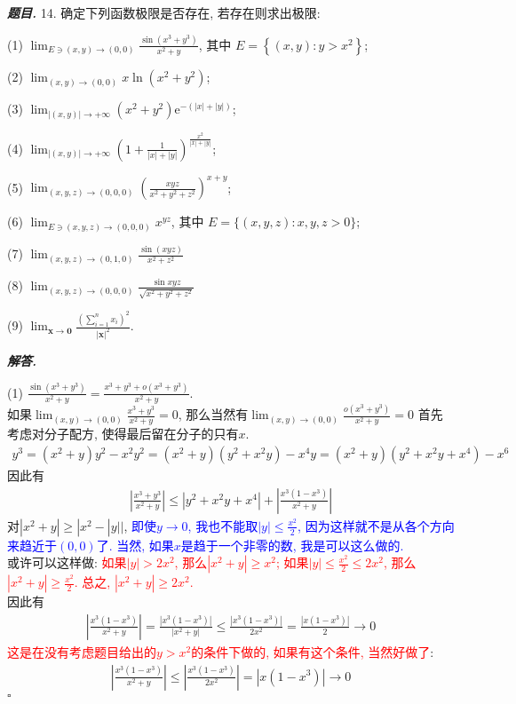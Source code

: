 \documentclass[10pt, a4paper, oneside]{ctexart}
\newenvironment{problem}{\begin{framed}\par\noindent\textbf{\textit{题目. }}}{\end{framed}\par}
\newenvironment{solution}{%
  \par\noindent\textbf{\textit{解答. }}\ignorespaces
}{%
  \hfill\ensuremath{\square}\par %
}
\begin{document}
\begin{problem}
14. 确定下列函数极限是否存在, 若存在则求出极限:

(1) $\lim _{E \ni(x, y) \rightarrow(0,0)} \frac{\sin \left(x^3+y^3\right)}{x^2+y}$, 其中 $E=\left\{(x, y): y>x^2\right\}$;

(2) $\lim _{(x, y) \rightarrow(0,0)} x \ln \left(x^2+y^2\right)$;

(3) $\lim _{|(x, y)| \rightarrow+\infty}\left(x^2+y^2\right) \mathrm{e}^{-(|x|+|y|)}$;

(4) $\lim _{|(x, y)| \rightarrow+\infty}\left(1+\frac{1}{|x|+|y|}\right)^{\frac{x^2}{|x|+|y|}}$;

(5) $\lim _{(x, y, z) \rightarrow(0,0,0)}\left(\frac{x y z}{x^2+y^2+z^2}\right)^{x+y}$;

(6) $\lim _{E \ni(x, y, z) \rightarrow(0,0,0)} x^{y z}$, 其中 $E=\{(x, y, z): x, y, z>0\}$;

(7) $\lim _{(x, y, z) \rightarrow(0,1,0)} \frac{\sin (x y z)}{x^2+z^2}$

(8) $\lim _{(x, y, z) \rightarrow(0,0,0)} \frac{\sin x y z}{\sqrt{x^2+y^2+z^2}}$

(9) $\lim _{\boldsymbol{x} \rightarrow \mathbf{0}} \frac{\left(\sum_{i=1}^n x_i\right)^2}{|\boldsymbol{x}|^2}$.
\end{problem}
\begin{solution}
(1) $\frac{\sin(x^3+y^3)}{x^2+y}=\frac{x^3+y^3+o(x^3+y^3)}{x^2+y}$. \\如果$\lim_{(x,y)\to (0,0)}\frac{x^3+y^3}{x^2+y}=0$, 那么当然有$\lim_{(x,y)\to (0,0)}\frac{o(x^3+y^3)}{x^2+y}=0$
首先考虑对分子配方, 使得最后留在分子的只有$x$.
\begin{align*}
    y^3=(x^2+y)y^2-x^2y^2=(x^2+y)(y^2+x^2y)-x^4y=(x^2+y)(y^2+x^2y+x^4)-x^6
\end{align*}
因此有
\begin{align*}
    |\frac{x^3+y^3}{x^2+y}|\leq |y^2+x^2y+x^4|+|\frac{x^3(1-x^3)}{x^2+y}|
\end{align*}
对$|x^2+y|\geq |x^2-|y||$, \textcolor{blue}{即使$y\to 0$, 我也不能取$|y|\leq \frac{x^2}{2}$, 因为这样就不是从各个方向来趋近于$(0,0)$了. 当然, 如果$x$是趋于一个非零的数, 我是可以这么做的.}\\
或许可以这样做: \textcolor{red}{如果$|y|>2x^2$, 那么$|x^2+y|\geq x^2$; 如果$|y|\leq \frac{x^2}{2}\leq 2x^2$, 那么$|x^2+y|\geq \frac{x^2}{2}$. 总之, $|x^2+y|\geq 2x^2$.}\\
因此有
\begin{align*}
    |\frac{x^3(1-x^3)}{x^2+y}|=\frac{|x^3(1-x^3)|}{|x^2+y|}\leq \frac{|x^3(1-x^3)|}{2x^2}=\frac{|x(1-x^3)|}{2}\to 0
\end{align*}
\textcolor{red}{这是在没有考虑题目给出的$y>x^2$的条件下做的, 如果有这个条件, 当然好做了}:
\begin{align*}
    |\frac{x^3(1-x^3)}{x^2+y}|\leq |\frac{x^3(1-x^3)}{2x^2}|=|x(1-x^3)|\to 0
\end{align*}
\end{solution}
\end{document}
